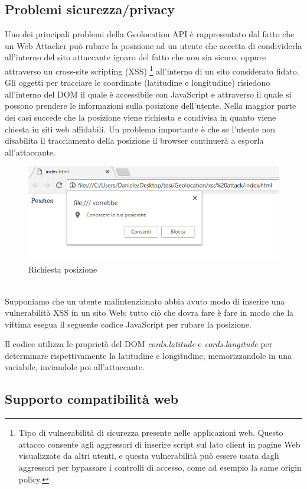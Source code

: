 \documentclass[11pt ,a4paper , twoside , openright ]{article}
\begin{document}
\subsection{Problemi sicurezza/privacy} 
Uno dei principali problemi della Geolocation API \cite{rif7, rif6} è rappresentato dal fatto che un Web Attacker può rubare la posizione ad un utente che accetta di condividerla all'interno del sito attaccante ignaro del fatto che non sia sicuro, oppure attraverso un cross-site scripting (XSS) \footnote{Tipo di vulnerabilità di sicurezza presente nelle applicazioni web. Questo attacco consente agli aggressori di inserire script sul lato client in pagine Web visualizzate da altri utenti, e questa vulnerabilità può essere usata dagli aggressori per bypassare i controlli di accesso, come ad esempio la same origin policy.} all'interno di un sito considerato fidato. Gli oggetti per tracciare le coordinate (latitudine e longitudine) risiedono all'interno del DOM il quale è accessibile con JavaScript e attraverso il quale si possono prendere le informazioni sulla posizione dell'utente. 
Nella maggior parte dei casi succede che la posizione viene richiesta e condivisa in quanto viene chiesta in siti web affidabili.
Un problema importante è che se l'utente non disabilita il tracciamento della posizione il browser continuerà a esporla all'attaccante.
\begin{figure}[h]
	\centering
	\includegraphics[width=0.5\linewidth]{pos1}
	\caption{Richiesta posizione}
	\label{fig: Richiesta posizione}
\end{figure}
\pagebreak
\\
Supponiamo che un utente malintenzionato abbia avuto modo di inserire una vulnerabilità XSS in un sito Web; tutto ciò che dovra fare è fare in modo che la vittima esegua il seguente codice JavaScript per rubare la posizione.

Il codice utilizza le proprietà del DOM \textit{cords.latitude} e \textit{cords.langitude} per determinare rispettivamente la latitudine e longitudine, memorizzandole in una variabile, inviandole poi all'attaccante. 
\\
\subsection{Supporto compatibilità web}
\end{document}
